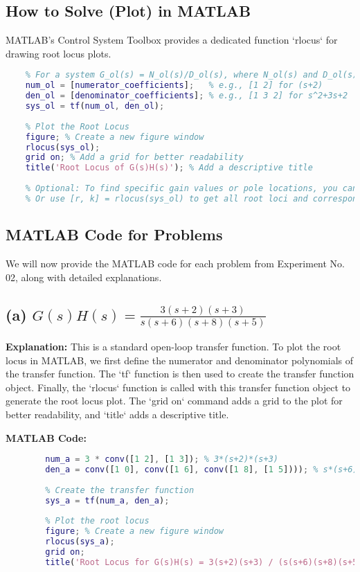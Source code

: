 \documentclass[a4paper,12pt]{article}
\begin{document}
\subsection*{How to Solve (Plot) in MATLAB}

MATLAB's Control System Toolbox provides a dedicated function `rlocus` for drawing root locus plots.

\begin{lstlisting}[language=Matlab, caption=General MATLAB usage for Root Locus Plot]
	% Define the open-loop transfer function G(s)H(s)
	% For a system G_ol(s) = N_ol(s)/D_ol(s), where N_ol(s) and D_ol(s) are polynomials in s
	num_ol = [numerator_coefficients];   % e.g., [1 2] for (s+2)
	den_ol = [denominator_coefficients]; % e.g., [1 3 2] for s^2+3s+2
	sys_ol = tf(num_ol, den_ol);
	
	% Plot the Root Locus
	figure; % Create a new figure window
	rlocus(sys_ol);
	grid on; % Add a grid for better readability
	title('Root Locus of G(s)H(s)'); % Add a descriptive title
	
	% Optional: To find specific gain values or pole locations, you can click on the plot.
	% Or use [r, k] = rlocus(sys_ol) to get all root loci and corresponding gains.
\end{lstlisting}
	\subsection*{MATLAB Code for Problems}

We will now provide the MATLAB code for each problem from Experiment No. 02, along with detailed explanations.
	
	\subsection*{(a) $G(s)H(s) = \frac{3(s+2)(s+3)}{s(s+6)(s+8)(s+5)}$}
	
	\textbf{Explanation:}
	This is a standard open-loop transfer function. To plot the root locus in MATLAB, we first define the numerator and denominator polynomials of the transfer function. The `tf` function is then used to create the transfer function object. Finally, the `rlocus` function is called with this transfer function object to generate the root locus plot. The `grid on` command adds a grid to the plot for better readability, and `title` adds a descriptive title.
	
	\textbf{MATLAB Code:}
	\begin{lstlisting}[language=Matlab, caption=MATLAB Code for System (a)]
		% Define the numerator and denominator polynomials
		num_a = 3 * conv([1 2], [1 3]); % 3*(s+2)*(s+3)
		den_a = conv([1 0], conv([1 6], conv([1 8], [1 5]))); % s*(s+6)*(s+8)*(s+5)
		
		% Create the transfer function
		sys_a = tf(num_a, den_a);
		
		% Plot the root locus
		figure; % Create a new figure window
		rlocus(sys_a);
		grid on;
		title('Root Locus for G(s)H(s) = 3(s+2)(s+3) / (s(s+6)(s+8)(s+5))');
	\end{lstlisting}
	
\end{document}
